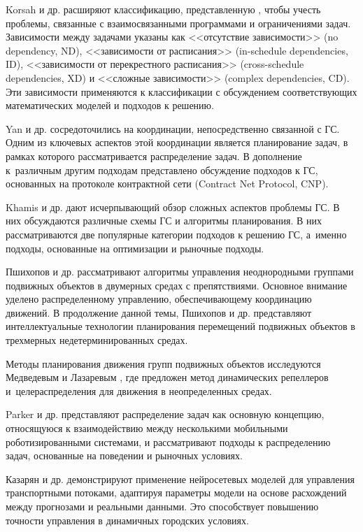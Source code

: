 Korsah и др. \cite{korsah2013comprehensive} расширяют классификацию, представленную \cite{gerkey2004formal}, чтобы учесть проблемы, связанные с взаимосвязанными программами и ограничениями задач. Зависимости между задачами указаны как <<отсутствие зависимости>> (no dependency, ND), <<зависимости от расписания>> (in-schedule dependencies, ID), <<зависимости от перекрестного расписания>> (cross-schedule dependencies, XD) и <<сложные зависимости>> (complex dependencies, CD). Эти зависимости применяются к классификации \cite{gerkey2004formal} с обсуждением соответствующих математических моделей и подходов к решению.

Yan и др. \cite{yan2013survey} сосредоточились на координации, непосредственно связанной с ГС. Одним из ключевых аспектов этой координации является планирование задач, в рамках которого рассматривается распределение задач. В дополнение к~различным другим подходам представлено обсуждение подходов к ГС, основанных на протоколе контрактной сети (Contract Net Protocol, CNP).

Khamis и др. \cite{khamis2015multi} дают исчерпывающий обзор сложных аспектов проблемы ГС. В них обсуждаются различные схемы ГС и алгоритмы планирования. В них рассматриваются две популярные категории подходов к решению ГС, а~именно подходы, основанные на оптимизации и рыночные подходы.

Пшихопов и др. \cite{PshikhopovMedvedevGaiduk2016} рассматривают алгоритмы управления неоднородными группами подвижных объектов в двумерных средах с препятствиями. Основное внимание уделено распределенному управлению, обеспечивающему координацию движений. В продолжение данной темы, Пшихопов и др. \cite{Pshikhopov2017} представляют интеллектуальные технологии планирования перемещений подвижных объектов в трехмерных недетерминированных средах.

Методы планирования движения групп подвижных объектов исследуются Медведевым и Лазаревым \cite{MedvevLazarev2016}, где предложен метод динамических репеллеров и~целераспределения для движения в неопределенных средах.

Parker и др. \cite{parker2016multiple} представляют распределение задач как основную концепцию, относящуюся к взаимодействию между несколькими мобильными роботизированными системами, и рассматривают подходы к распределению задач, основанные на поведении и рыночных условиях.

Казарян и др. \cite{KazaryanMikhalevSofronova2017} демонстрируют применение нейросетевых моделей для управления транспортными потоками, адаптируя параметры модели на основе расхождений между прогнозами и реальными данными. Это способствует повышению точности управления в динамичных городских условиях.

